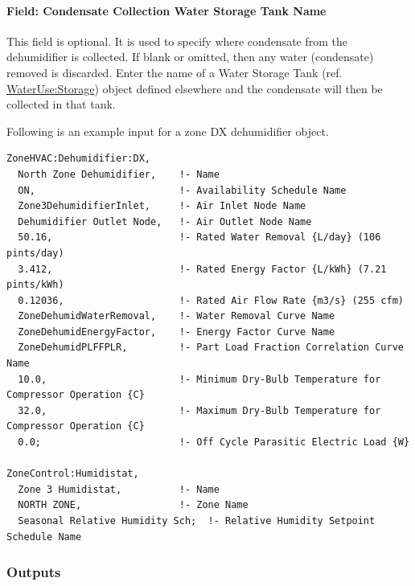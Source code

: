 \paragraph{Field: Condensate Collection Water Storage Tank Name}\label{field-condensate-collection-water-storage-tank-name-000}

This field is optional. It is used to specify where condensate from the dehumidifier is collected. If blank or omitted, then any water (condensate) removed is discarded. Enter the name of a Water Storage Tank (ref. \hyperref[waterusestorage]{WaterUse:Storage}) object defined elsewhere and the condensate will then be collected in that tank.

Following is an example input for a zone DX dehumidifier object.

\begin{lstlisting}
ZoneHVAC:Dehumidifier:DX,
  North Zone Dehumidifier,    !- Name
  ON,                         !- Availability Schedule Name
  Zone3DehumidifierInlet,     !- Air Inlet Node Name
  Dehumidifier Outlet Node,   !- Air Outlet Node Name
  50.16,                      !- Rated Water Removal {L/day} (106 pints/day)
  3.412,                      !- Rated Energy Factor {L/kWh} (7.21 pints/kWh)
  0.12036,                    !- Rated Air Flow Rate {m3/s} (255 cfm)
  ZoneDehumidWaterRemoval,    !- Water Removal Curve Name
  ZoneDehumidEnergyFactor,    !- Energy Factor Curve Name
  ZoneDehumidPLFFPLR,         !- Part Load Fraction Correlation Curve Name
  10.0,                       !- Minimum Dry-Bulb Temperature for Compressor Operation {C}
  32.0,                       !- Maximum Dry-Bulb Temperature for Compressor Operation {C}
  0.0;                        !- Off Cycle Parasitic Electric Load {W}

ZoneControl:Humidistat,
  Zone 3 Humidistat,          !- Name
  NORTH ZONE,                 !- Zone Name
  Seasonal Relative Humidity Sch;  !- Relative Humidity Setpoint Schedule Name
\end{lstlisting}

\subsubsection{Outputs}\label{outputs-10-008}

